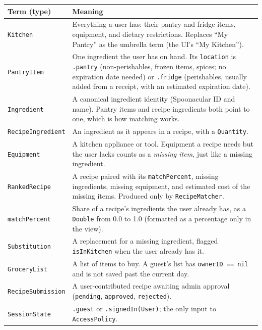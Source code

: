{\small\begin{tabularx}{\textwidth}{@{}L{3.4cm}Y@{}}
\toprule
\textbf{Term (type)} & \textbf{Meaning} \\
\midrule
\texttt{Kitchen} & Everything a user has: their pantry and fridge items, equipment, and dietary restrictions. Replaces ``My Pantry'' as the umbrella term (the UI's ``My Kitchen''). \\
\texttt{PantryItem} & One ingredient the user has on hand. Its \texttt{location} is \texttt{.pantry} (non-perishables, frozen items, spices; no expiration date needed) or \texttt{.fridge} (perishables, usually added from a receipt, with an estimated expiration date). \\
\texttt{Ingredient} & A canonical ingredient identity (Spoonacular ID and name). Pantry items and recipe ingredients both point to one, which is how matching works. \\
\texttt{RecipeIngredient} & An ingredient as it appears in a recipe, with a \texttt{Quantity}. \\
\texttt{Equipment} & A kitchen appliance or tool. Equipment a recipe needs but the user lacks counts as a \emph{missing item}, just like a missing ingredient. \\
\texttt{RankedRecipe} & A recipe paired with its \texttt{matchPercent}, missing ingredients, missing equipment, and estimated cost of the missing items. Produced only by \texttt{RecipeMatcher}. \\
\texttt{matchPercent} & Share of a recipe's ingredients the user already has, as a \texttt{Double} from 0.0 to 1.0 (formatted as a percentage only in the view). \\
\texttt{Substitution} & A replacement for a missing ingredient, flagged \texttt{isInKitchen} when the user already has it. \\
\texttt{GroceryList} & A list of items to buy. A guest's list has \texttt{ownerID == nil} and is not saved past the current day. \\
\texttt{RecipeSubmission} & A user-contributed recipe awaiting admin approval (\texttt{pending}, \texttt{approved}, \texttt{rejected}). \\
\texttt{SessionState} & \texttt{.guest} or \texttt{.signedIn(User)}; the only input to \texttt{AccessPolicy}. \\
\bottomrule
\end{tabularx}}

